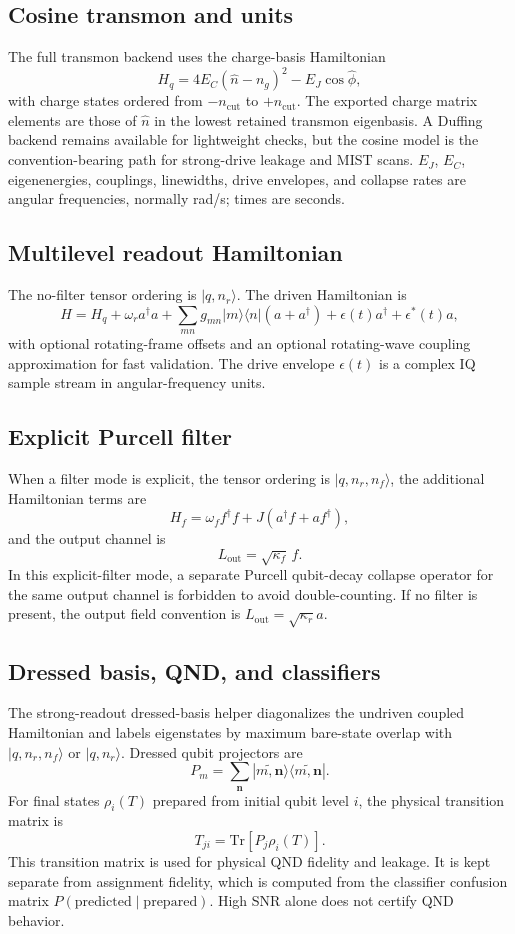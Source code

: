 \documentclass[11pt]{article}
\begin{document}
\subsection*{Cosine transmon and units}
The full transmon backend uses the charge-basis Hamiltonian
\[
H_q = 4 E_C (\hat n-n_g)^2 - E_J \cos\hat\phi,
\]
with charge states ordered from \(-n_{\mathrm{cut}}\) to
\(+n_{\mathrm{cut}}\). The exported charge matrix elements are those of
\(\hat n\) in the lowest retained transmon eigenbasis. A Duffing backend remains
available for lightweight checks, but the cosine model is the convention-bearing
path for strong-drive leakage and MIST scans. \(E_J\), \(E_C\), eigenenergies,
couplings, linewidths, drive envelopes, and collapse rates are angular
frequencies, normally rad/s; times are seconds.

\subsection*{Multilevel readout Hamiltonian}
The no-filter tensor ordering is \(|q,n_r\rangle\). The driven Hamiltonian is
\[
H = H_q + \omega_r a^\dagger a
  + \sum_{mn} g_{mn}|m\rangle\langle n| (a+a^\dagger)
  + \epsilon(t)a^\dagger + \epsilon^*(t)a,
\]
with optional rotating-frame offsets and an optional rotating-wave coupling
approximation for fast validation. The drive envelope \(\epsilon(t)\) is a
complex IQ sample stream in angular-frequency units.

\subsection*{Explicit Purcell filter}
When a filter mode is explicit, the tensor ordering is
\(|q,n_r,n_f\rangle\), the additional Hamiltonian terms are
\[
H_f = \omega_f f^\dagger f + J(a^\dagger f + a f^\dagger),
\]
and the output channel is
\[
L_{\mathrm{out}}=\sqrt{\kappa_f}\,f.
\]
In this explicit-filter mode, a separate Purcell qubit-decay collapse operator
for the same output channel is forbidden to avoid double-counting. If no filter
is present, the output field convention is \(L_{\mathrm{out}}=\sqrt{\kappa_r}a\).

\subsection*{Dressed basis, QND, and classifiers}
The strong-readout dressed-basis helper diagonalizes the undriven coupled
Hamiltonian and labels eigenstates by maximum bare-state overlap with
\(|q,n_r,n_f\rangle\) or \(|q,n_r\rangle\). Dressed qubit projectors are
\[
P_m = \sum_{\mathbf n} |\widetilde{m,\mathbf n}\rangle
      \langle\widetilde{m,\mathbf n}|.
\]
For final states \(\rho_i(T)\) prepared from initial qubit level \(i\), the
physical transition matrix is
\[
T_{j i} = \mathrm{Tr}[P_j \rho_i(T)].
\]
This transition matrix is used for physical QND fidelity and leakage. It is
kept separate from assignment fidelity, which is computed from the classifier
confusion matrix \(P(\mathrm{predicted}\mid\mathrm{prepared})\). High SNR alone
does not certify QND behavior.
\end{document}
